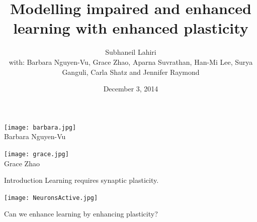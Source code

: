 \documentclass{beamer}%
\title[Impaired/enhanced learning w/ enhanced plasticity]{Modelling impaired  and enhanced learning with enhanced plasticity}
\author[S.~Lahiri et al.]{Subhaneil Lahiri \texorpdfstring{\\}{} with: Barbara Nguyen-Vu, Grace Zhao, Aparna Suvrathan, Han-Mi Lee, Surya Ganguli, Carla Shatz and Jennifer Raymond%
}
\institute[Stanford]{%
Stanford University
}
\date{December 3, 2014}
\begin{document}

\begin{frame}
%
 \titlepage

 \vspace{-1cm}
 \parbox[t]{0.3\linewidth}{
 \begin{center}
 \texttt{[image: barbara.jpg]}\\
 \small Barbara Nguyen-Vu
 \end{center}
 }
 \hfill
 \parbox[t]{0.3\linewidth}{
 \begin{center}
 \texttt{[image: grace.jpg]}\\
 \small Grace Zhao
 \end{center}
 }
%
\end{frame}


\begin{frame}{Introduction}
%
 Learning requires synaptic plasticity.
 \begin{center}
   \texttt{[image: NeuronsActive.jpg]}
 \end{center}
 Can we enhance learning by enhancing plasticity?

 \vp
 \begin{center}
 \end{center}
%
\end{frame}


\end{document}
